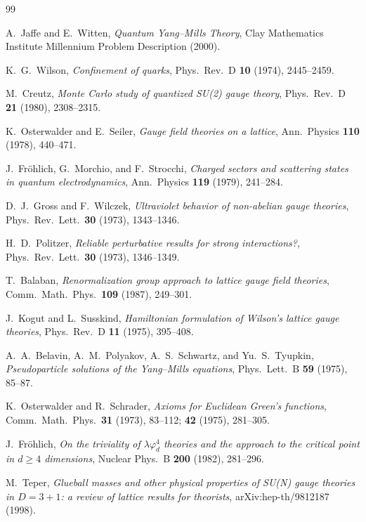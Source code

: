 \documentclass[11pt]{article}
\begin{document}
\begin{thebibliography}{99}

A.~Jaffe and E.~Witten,
\textit{Quantum Yang--Mills Theory},
Clay Mathematics Institute Millennium Problem Description (2000).

K.~G.~Wilson,
\textit{Confinement of quarks},
Phys.\ Rev.\ D \textbf{10} (1974), 2445--2459.

M.~Creutz,
\textit{Monte Carlo study of quantized SU(2) gauge theory},
Phys.\ Rev.\ D \textbf{21} (1980), 2308--2315.

K.~Osterwalder and E.~Seiler,
\textit{Gauge field theories on a lattice},
Ann.\ Physics \textbf{110} (1978), 440--471.

J.~Fr\"ohlich, G.~Morchio, and F.~Strocchi,
\textit{Charged sectors and scattering states in quantum electrodynamics},
Ann.\ Physics \textbf{119} (1979), 241--284.

D.~J.~Gross and F.~Wilczek,
\textit{Ultraviolet behavior of non-abelian gauge theories},
Phys.\ Rev.\ Lett.\ \textbf{30} (1973), 1343--1346.

H.~D.~Politzer,
\textit{Reliable perturbative results for strong interactions?},
Phys.\ Rev.\ Lett.\ \textbf{30} (1973), 1346--1349.

T.~Balaban,
\textit{Renormalization group approach to lattice gauge field theories},
Comm.\ Math.\ Phys.\ \textbf{109} (1987), 249--301.

J.~Kogut and L.~Susskind,
\textit{Hamiltonian formulation of Wilson's lattice gauge theories},
Phys.\ Rev.\ D \textbf{11} (1975), 395--408.

A.~A.~Belavin, A.~M.~Polyakov, A.~S.~Schwartz, and Yu.~S.~Tyupkin,
\textit{Pseudoparticle solutions of the Yang--Mills equations},
Phys.\ Lett.\ B \textbf{59} (1975), 85--87.

K.~Osterwalder and R.~Schrader,
\textit{Axioms for Euclidean Green's functions},
Comm.\ Math.\ Phys.\ \textbf{31} (1973), 83--112;
\textbf{42} (1975), 281--305.

J.~Fr\"ohlich,
\textit{On the triviality of $\lambda\varphi_d^4$ theories and the
approach to the critical point in $d \geq 4$ dimensions},
Nuclear Phys.\ B \textbf{200} (1982), 281--296.

M.~Teper,
\textit{Glueball masses and other physical properties of SU(N) gauge
theories in $D = 3+1$: a review of lattice results for theorists},
arXiv:hep-th/9812187 (1998).


\end{thebibliography}
\end{document}
